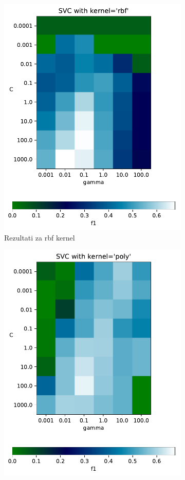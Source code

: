 \documentclass[a4paper]{article}
\begin{document}
\begin{figure}
	\centering
	\begin{subfigure}{.5\textwidth}
		\centering
		\includegraphics[width=.8\linewidth]{images/SVC_kernel_rbf.pdf}
		\caption{Rezultati za rbf kernel \hfill \break \hfill \break \hfill \break}
		\label{fig:sub1}
	\end{subfigure}%
	\begin{subfigure}{.5\textwidth}
		\centering
		\includegraphics[width=.8\linewidth]{images/SVC_kernel_poly.pdf}

\end{subfigure}
\end{figure}
\end{document}
